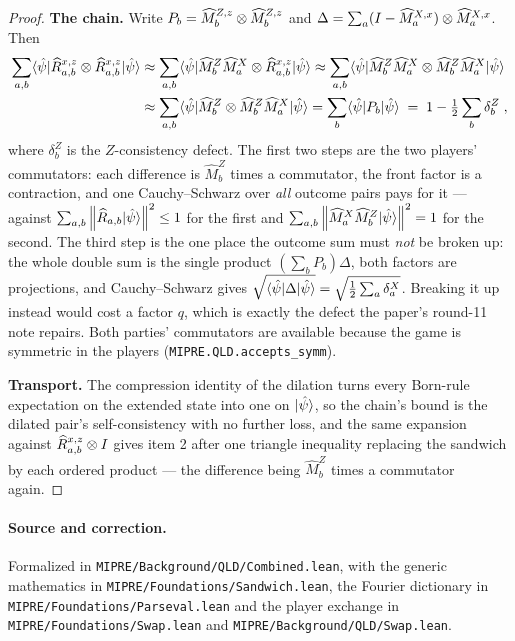 \begin{proof}
\textbf{The chain.} Write $P_b = \widehat{M}^{Z, z}_b \otimes \widehat{M}^{Z, z}_b$ and
$\Delta = \sum_a (I - \widehat{M}^{X, x}_a) \otimes \widehat{M}^{X, x}_a$. Then
\begin{align*}
  \sum_{a, b} \langle\hat\psi| \widehat{R}^{x, z}_{a, b} \otimes \widehat{R}^{x, z}_{a, b}
      |\hat\psi\rangle
  &\approx \sum_{a, b} \langle\hat\psi| \widehat{M}^{Z}_b \widehat{M}^{X}_a \otimes
      \widehat{R}^{x, z}_{a, b} |\hat\psi\rangle
  \approx \sum_{a, b} \langle\hat\psi| \widehat{M}^{Z}_b \widehat{M}^{X}_a \otimes
      \widehat{M}^{Z}_b \widehat{M}^{X}_a |\hat\psi\rangle \\
  &\approx \sum_{a, b} \langle\hat\psi| \widehat{M}^{Z}_b \otimes
      \widehat{M}^{Z}_b \widehat{M}^{X}_a |\hat\psi\rangle
  = \sum_b \langle\hat\psi| P_b |\hat\psi\rangle
  \;=\; 1 - \tfrac12 \sum_b \delta^Z_b\;,
\end{align*}
where $\delta^Z_b$ is the $Z$-consistency defect. The first two steps are the two players'
commutators: each difference is $\widehat{M}^Z_b$ times a commutator, the front factor is a
contraction, and one Cauchy--Schwarz over \emph{all} outcome pairs pays for it --- against
$\sum_{a,b} \left\| {\widehat{R}_{a,b} |\hat\psi\rangle} \right\|^2 \leq 1$ for the first and
$\sum_{a,b} \left\| {\widehat{M}^X_a \widehat{M}^Z_b |\hat\psi\rangle} \right\|^2 = 1$ for the second. The
third step is the one place the outcome sum must \emph{not} be broken up: the whole double sum is
the single product $(\sum_b P_b) \Delta$, both factors are projections, and Cauchy--Schwarz gives
$\sqrt{\langle\hat\psi| \Delta |\hat\psi\rangle} = \sqrt{\tfrac12 \sum_a \delta^X_a}$. Breaking it up
instead would cost a factor $q$, which is exactly the defect the paper's round-11 note repairs.
Both parties' commutators are available because the game is symmetric in the players
(\texttt{MIPRE.QLD.accepts\_symm}).

\textbf{Transport.} The compression identity of the dilation turns every Born-rule expectation on
the extended state into one on $|\hat\psi\rangle$, so the chain's bound is the dilated pair's
self-consistency with no further loss, and the same expansion against
$\widehat{R}^{x, z}_{a, b} \otimes I$ gives item 2 after one triangle inequality replacing the
sandwich by each ordered product --- the difference being $\widehat{M}^Z_b$ times a commutator
again.
\end{proof}

\paragraph{Source and correction.} Formalized in \texttt{MIPRE/Background/QLD/Combined.lean},
with the generic mathematics in \texttt{MIPRE/Foundations/Sandwich.lean}, the Fourier dictionary
in \texttt{MIPRE/Foundations/Parseval.lean} and the player exchange in
\texttt{MIPRE/Foundations/Swap.lean} and \texttt{MIPRE/Background/QLD/Swap.lean}.

